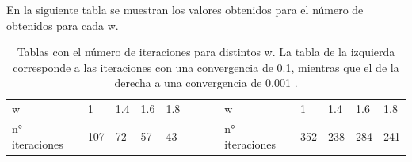 \documentclass[letterpaper,oneside]{article}
\begin{document}
En la siguiente tabla se muestran los valores obtenidos para el número de obtenidos para cada w.
\begin{table}
\begin{tabular}{|l|l|l|l|l|lll|l|l|l|l|l|}
\cline{1-5} \cline{9-13}
w              & 1   & 1.4 & 1.6 & 1.8 &  &  &  & w              & 1   & 1.4 & 1.6 & 1.8 \\ \cline{1-5} \cline{9-13} 
n° iteraciones & 107 & 72  & 57  & 43  &  &  &  & n° iteraciones & 352 & 238 & 284 & 241 \\ \cline{1-5} \cline{9-13} 
\end{tabular}
\label{tabla}
\caption{Tablas con el número de iteraciones para distintos w. La tabla de la izquierda corresponde a las iteraciones con una convergencia de 0.1, mientras que el de la derecha a una convergencia de 0.001 .}
\end{table}
\end{document}
